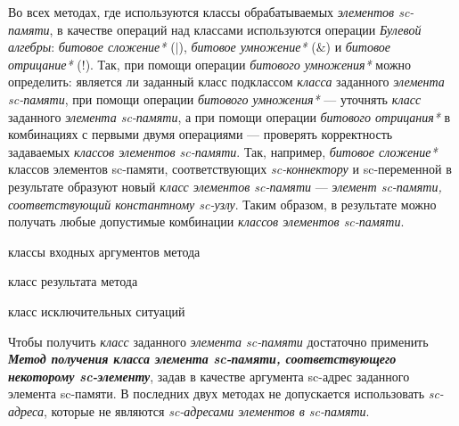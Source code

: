 Во всех методах, где используются классы обрабатываемых \textit{элементов sc-памяти}, в качестве операций над классами используются операции \textit{Булевой алгебры}: \textit{битовое сложение*} ($|$), \textit{битовое умножение*} ($\&$) и \textit{битовое отрицание*} ($!$). Так, при помощи операции \textit{битового умножения*} можно определить: является ли заданный класс подклассом \textit{класса} заданного \textit{элемента sc-памяти\scnsupergroupsign}, при помощи операции \textit{битового умножения*} --- уточнять \textit{класс} заданного \textit{элемента sc-памяти\scnsupergroupsign}, а при помощи операции \textit{битового отрицания*} в комбинациях с первыми двумя операциями --- проверять корректность задаваемых \textit{классов элементов sc-памяти\scnsupergroupsign}. Так, например, \textit{битовое сложение*} классов элементов sc-памяти, соответствующих \textit{sc-коннектору} и sc-переменной в результате образуют новый \textit{класс элементов sc-памяти\scnsupergroupsign} --- \textit{элемент sc-памяти, соответствующий константному sc-узлу}. Таким образом, в результате можно получать любые допустимые комбинации \textit{классов элементов sc-памяти\scnsupergroupsign}.

\begin{SCn}
\begin{scnindent}
\end{scnindent}
\begin{scnrelfromvector}{классы входных аргументов метода}
\end{scnrelfromvector}
\begin{scnrelfromlist}{класс результата метода}
\end{scnrelfromlist}
\begin{scnrelfromlist}{класс исключительных ситуаций}
\end{scnrelfromlist}
\end{SCn}

Чтобы получить \textit{класс} заданного \textit{элемента sc-памяти\scnsupergroupsign} достаточно применить \textbf{\textit{Метод получения класса элемента sc-памяти, соответствующего некоторому sc-элементу}}, задав в качестве аргумента sc-адрес заданного элемента sc-памяти. В последних двух методах не допускается использовать \textit{sc-адреса}, которые не являются \textit{sc-адресами элементов в sc-памяти}.


